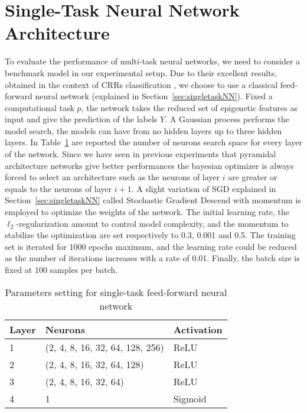 \section{Single-Task Neural Network Architecture} 
\label{sec:exp_setup_singletask}
To evaluate the performance of multi-task neural networks, we need to consider a benchmark model in our experimental setup. Due to their excellent results, obtained in the context of CRRs classification \cite{WassermannDECRES}, we choose to use a classical feed-forward neural network (explained in Section~\ref{sec:singletaskNN}). Fixed a computational task $p$, the network takes the reduced set of epigenetic features as input and give the prediction of the labels $Y$. A Gaussian process performs the model search, the models can have from no hidden layers up to three hidden layers. In Table~\ref{tab:mlp_single_arch} are reported the number of neurons search space for every layer of the network. Since we have seen in previous experiments that pyramidal architecture networks give better performances the bayesian optimizer is always forced to select an architecture such as the neurons of layer $i$ are greater or equals to the neurons of layer $i+1$. 
A slight variation of SGD explained in Section~\ref{sec:singletaskNN} called Stochastic Gradient Descend with momentum is employed to optimize the weights of the network. The initial learning rate, the $\ell_2$-regularization amount to control model complexity, and the momentum to stabilize the optimization are set respectively to 0.3, 0.001 and 0.5. The training set is iterated for 1000 epochs maximum, and the learning rate could be reduced as the number of iterations increases with a rate of 0.01. Finally, the batch size is fixed at 100 samples per batch.  
\begin{table}[t]
\centering
\begin{tabular}{lll}
\toprule
\textbf{Layer} & \textbf{Neurons} & \textbf{Activation} \\ 
\midrule
1 & (2, 4, 8, 16, 32, 64, 128, 256) & ReLU \\ 
2 & (2, 4, 8, 16, 32, 64, 128) & ReLU \\ 
3 & (2, 4, 8, 16, 32, 64) & ReLU \\ 
4 & 1 & Sigmoid \\ 
\bottomrule
\end{tabular}
\caption{Parameters setting for single-task feed-forward neural network}
\label{tab:mlp_single_arch}
\end{table}

